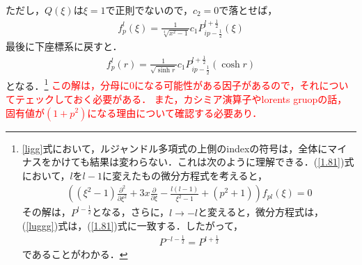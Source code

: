 ただし，$Q(\xi)$は$\xi=1$で正則でないので，$c_2=0$で落とせば，
\begin{align}
  f^l_p(\xi)=\frac{1}{\sqrt[4]{x^2-1}}c_1 P_{i p-\frac{1}{2}}^{l+\frac{1}{2}}(\xi)
\end{align}
最後に下座標系に戻すと．
\begin{align}
  \label{lugg}
  f^l_p(r)=\frac{1}{\sqrt{\sinh r}}c_1 P_{i p-\frac{1}{2}}^{l+\frac{1}{2}}(\cosh r)
\end{align}
となる．\footnote{\ref{ligg}式において，ルジャンドル多項式の上側のindexの符号は，全体にマイナスをかけても結果は変わらない．これは次のように理解できる．(\ref{1.81})式において，$l$を$l-1$に変えたもの微分方程式を考えると，
\begin{align}
\label{luggg}
\left(\left(\xi^2-1\right)\frac{\partial^2}{\partial \xi^2}+3 x \frac{\partial}{\partial \xi}-\frac{l (l-1)}{\xi^2-1}+(p^2+1)\right)f_{pl}(\xi)=0
\end{align}
その解は，$P^{l-\frac{1}{2}}$となる，さらに，$l\to-l$と変えると，微分方程式は，(\ref{luggg})式は，(\ref{1.81})式に一致する．したがって，
\begin{align}
  P^{-l-\frac{1}{2}}=P^{l+\frac{1}{2}}
\end{align}
であることがわかる．
}
\textcolor{red}{この解は，分母に$0$になる可能性がある因子があるので，それについてテェックしておく必要がある．
また，カシミア演算子やlorents gruopの話，固有値が$(1+p^2)$になる理由について確認する必要あり．}

